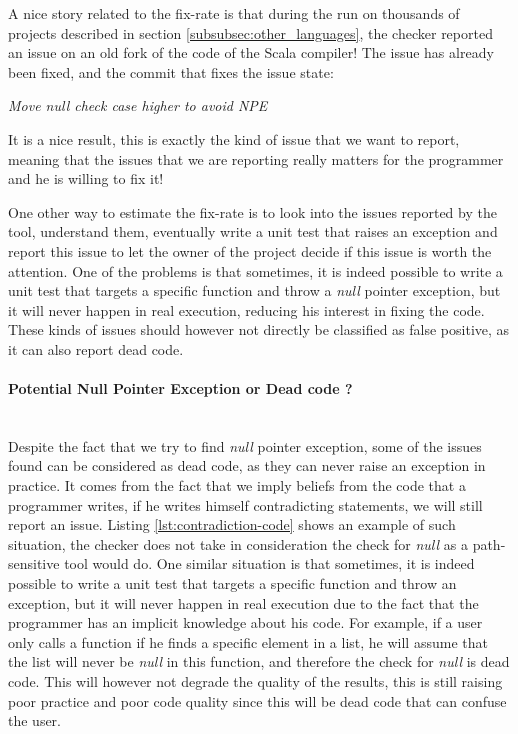 A nice story related to the fix-rate is that during the run on thousands of projects described in section \ref{subsubsec:other_languages}, the checker reported an issue on an old fork of the code of the Scala compiler! 
The issue has already been fixed, and the commit that fixes the issue state:

\begin{displayquote}
	\centering
	\textit{Move null check case higher to avoid NPE}
\end{displayquote}

It is a nice result, this is exactly the kind of issue that we want to report, meaning that the issues that we are reporting really matters for the programmer and he is willing to fix it!

One other way to estimate the fix-rate is to look into the issues reported by the tool, understand them, eventually write a unit test that raises an exception and report this issue to let the owner of the project decide if this issue is worth the attention.
One of the problems is that sometimes, it is indeed possible to write a unit test that targets a specific function and throw a \emph{null} pointer exception, but it will never happen in real execution, reducing his interest in fixing the code.
These kinds of issues should however not directly be classified as false positive, as it can also report dead code.



\paragraph{Potential Null Pointer Exception or Dead code ?}\mbox{}\\
\label{subsubsec:dead_code}
Despite the fact that we try to find \emph{null} pointer exception, some of the issues found can be considered as dead code, as they can never raise an exception in practice.
It comes from the fact that we imply beliefs from the code that a programmer writes, if he writes himself contradicting statements, we will still report an issue.
Listing \ref{lst:contradiction-code} shows an example of such situation, the checker does not take in consideration the check for \emph{null} as a path-sensitive tool would do. \newline
One similar situation is that sometimes, it is indeed possible to write a unit test that targets a specific function and throw an exception, but it will never happen in real execution due to the fact that the programmer has an implicit knowledge about his code. 
For example, if a user only calls a function if he finds a specific element in a list, he will assume that the list will never be \emph{null} in this function, and therefore the check for \emph{null} is dead code. 
This will however not degrade the quality of the results, this is still raising poor practice and poor code quality since this will be dead code that can confuse the user.



